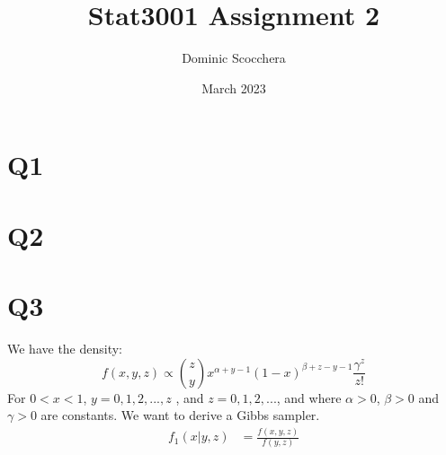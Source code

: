 \documentclass{article}
\title{Stat3001 Assignment 2}
\author{Dominic Scocchera}
\date{March 2023}
\begin{document}
\maketitle
\section*{Q1}

\section*{Q2}
\section*{Q3}
We have the density:
$$f(x, y, z)\propto {z\choose y}x^{\alpha+y-1}(1-x)^{\beta+z-y-1}\frac{\gamma^z}{z!}$$
For $0<x<1$, $y=0,1,2,...,z$ , and $z=0,1,2,...$, and where $\alpha>0$, $\beta >0$ and $\gamma>0$ are constants.
\newline\newline
We want to derive a Gibbs sampler.
\newline\newline
\begin{align*}
f_1(x|y,z)&=\frac{f(x,y,z)}{f(y,z)}
\end{align*}
\end{document}
